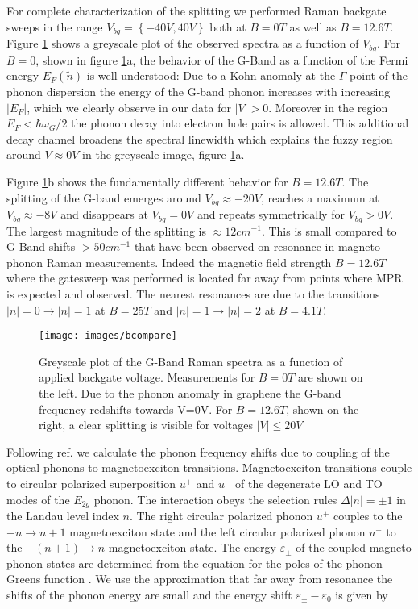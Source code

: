 \documentclass[prl,aps,superscriptaddress,reprint]{revtex4-1}
\begin{document}
For complete characterization of the splitting we performed Raman backgate sweeps in the range $V_{bg}=\left\lbrace -40V,40V \right\rbrace$ both at $B=0T$ as well as $B=12.6T$. Figure \ref{bcompare} shows a greyscale plot of the observed spectra as a function of $V_{bg}$.
For $B=0$, shown in figure \ref{bcompare}a, the behavior of the G-Band as a function of the Fermi energy $E_F(\widetilde{n})$ is well understood: Due to a Kohn anomaly at the $\Gamma$ point of the phonon dispersion the energy of the G-band phonon increases with increasing $\left|E_F\right|$\cite{tsuneya2006anomaly,pisana2007breakdown,yan2007electric}, which we clearly observe in our data for $\left|V\right| > 0$. Moreover in the region $E_F<\hbar \omega_G/2$ the phonon decay into electron hole pairs is allowed. This additional decay channel broadens the spectral linewidth which explains the fuzzy region around $V\approx 0V$ in the greyscale image, figure \ref{bcompare}a. 

Figure \ref{bcompare}b shows the fundamentally different behavior for $B=12.6T$. The splitting of the G-band emerges around $V_{bg} \approx -20V$, reaches a maximum at $V_{bg} \approx -8V$ and disappears at $V_{bg} = 0V$ and repeats symmetrically for $V_{bg}>0V$. The largest magnitude of the splitting is $\approx 12cm^{-1}$. This is small compared to G-Band shifts $>50cm^{-1}$ that have been observed on resonance in magneto-phonon Raman measurements.
Indeed the magnetic field strength $B=12.6T$ where the gatesweep was performed is located far away from points where MPR is expected and observed. The nearest resonances are due to the transitions $\left|n\right|=0 \rightarrow \left|n\right|=1$ at $B=25T$ and $\left|n\right|=1 \rightarrow \left|n\right|=2$ at $B=4.1T$.  
\begin{figure}[b]
    \texttt{[image: images/bcompare]}
    \caption{\label{bcompare} Greyscale plot of the G-Band Raman spectra as a function of applied backgate voltage. Measurements for $B=0T$ are shown on the left. Due to the phonon anomaly in graphene the G-band frequency redshifts towards V=0V. For $B=12.6T$, shown on the right, a clear splitting is visible for voltages $\left|V\right|\leq 20V$}
\end{figure}

Following ref. \cite{goerbig2007filling,kossacki2012circular} we calculate the phonon frequency shifts due to coupling of the optical phonons to magnetoexciton transitions. 
Magnetoexciton transitions couple to circular polarized superposition $u^+$ and $u^-$ of the degenerate LO and TO modes of the $E_{2g}$ phonon. The interaction obeys the selection rules  $\Delta\left|n\right|=\pm 1$ in the Landau level index $n$. The right circular polarized phonon $u^+$ couples to the $-n\rightarrow n+1$ magnetoexciton state and the left circular polarized phonon $u^-$ to the $-(n+1)\rightarrow n$ magnetoexciton state.  
The energy $\varepsilon_{\pm}$ of the coupled magneto phonon states are determined from the equation for the poles of the phonon Greens function \cite{goerbig2007filling,ando2007magnetic,kossacki2012circular}. We use the approximation that far away from resonance the shifts of the phonon energy are small and the energy shift $\varepsilon_{\pm} - \varepsilon_0$  is given by
\end{document}
